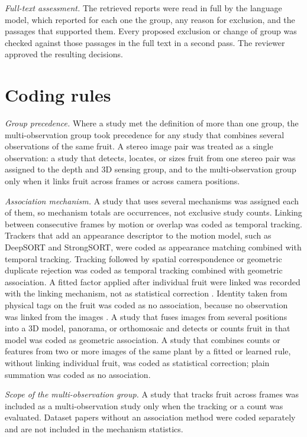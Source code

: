 \documentclass[a4paper,11pt]{article}
\begin{document}
\textit{Full-text assessment.} The \nFTAssessed retrieved reports were read in full by the language model, which reported for each one the group, any reason for exclusion, and the passages that supported them. Every proposed exclusion or change of group was checked against those passages in the full text in a second pass. The reviewer approved the resulting decisions.

\section{Coding rules}\label{sup:coding}

\textit{Group precedence.} Where a study met the definition of more than one group, the multi-observation group took precedence for any study that combines several observations of the same fruit. A stereo image pair was treated as a single observation: a study that detects, locates, or sizes fruit from one stereo pair was assigned to the depth and 3D sensing group, and to the multi-observation group only when it links fruit across frames or across camera positions.

\textit{Association mechanism.} A study that uses several mechanisms was assigned each of them, so mechanism totals are occurrences, not exclusive study counts. Linking between consecutive frames by motion or overlap was coded as temporal tracking. Trackers that add an appearance descriptor to the motion model, such as DeepSORT and StrongSORT, were coded as appearance matching combined with temporal tracking. Tracking followed by spatial correspondence or geometric duplicate rejection was coded as temporal tracking combined with geometric association. A fitted factor applied after individual fruit were linked was recorded with the linking mechanism, not as statistical correction \citep{nuske2014modeling,wang2013automated}. Identity taken from physical tags on the fruit was coded as no association, because no observation was linked from the images \citep{kassim2012oil}. A study that fuses images from several positions into a 3D model, panorama, or orthomosaic and detects or counts fruit in that model was coded as geometric association. A study that combines counts or features from two or more images of the same plant by a fitted or learned rule, without linking individual fruit, was coded as statistical correction; plain summation was coded as no association.

\textit{Scope of the multi-observation group.} A study that tracks fruit across frames was included as a multi-observation study only when the tracking or a count was evaluated. Dataset papers without an association method were coded separately and are not included in the mechanism statistics.
\end{document}
